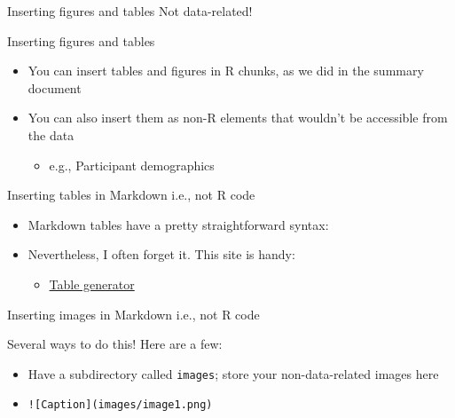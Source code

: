 \documentclass[
  ignorenonframetext,
]{beamer}
\providecommand{\tightlist}{%
  \setlength{\itemsep}{0pt}\setlength{\parskip}{0pt}}
\begin{document}
\begin{frame}[fragile]{Inserting figures and tables \textbar{} Not
data-related!}
\protect\hypertarget{inserting-figures-and-tables-not-data-related}{}

\begin{block}{Inserting figures and tables}

\begin{itemize}
\tightlist
\item
  You can insert tables and figures in R chunks, as we did in the
  summary document
\item
  You can also insert them as non-R elements that wouldn't be accessible
  from the data

  \begin{itemize}
  \tightlist
  \item
    e.g., Participant demographics
  \end{itemize}
\end{itemize}

\end{block}

\begin{block}{Inserting tables in Markdown \textbar{} i.e., not R code}

\begin{itemize}
\tightlist
\item
  Markdown tables have a pretty straightforward syntax:
\end{itemize}

\begin{itemize}
\tightlist
\item
  Nevertheless, I often forget it. This site is handy:

  \begin{itemize}
  \tightlist
  \item
    \href{http://www.tablesgenerator.com/markdown_tables}{Table
    generator}
  \end{itemize}
\end{itemize}

\end{block}

\begin{block}{Inserting images in Markdown \textbar{} i.e., not R code}

Several ways to do this! Here are a few:

\begin{itemize}
\item
  Have a subdirectory called \texttt{images}; store your
  non-data-related images here
\item
  \texttt{!{[}Caption{]}(images/image1.png)} 
\end{itemize}


\end{block}
\end{frame}
\end{document}
